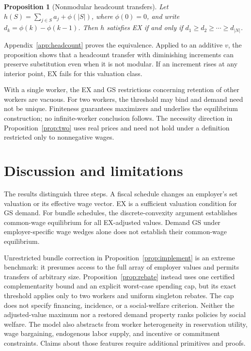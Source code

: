 \documentclass[11pt]{article}
\newtheorem{proposition}{Proposition}
\theoremstyle{definition}
\theoremstyle{remark}
\numberwithin{equation}{section}
\begin{document}
\begin{proposition}[Nonmodular headcount transfers]\label{prop:headcount}
Let $h(S)=\sum_{j\in S}a_j+\phi(|S|)$, where $\phi(0)=0$, and write $d_k=\phi(k)-\phi(k-1)$. Then $h$ satisfies EX if and only if $d_1\ge d_2\ge\cdots\ge d_{|N|}$.
\end{proposition}
\noindent Appendix~\ref{app:headcount} proves the equivalence. Applied to an additive $v$, the proposition shows that a headcount transfer with diminishing increments can preserve substitution even when it is not modular. If an increment rises at any interior point, EX fails for this valuation class.

With a single worker, the EX and GS restrictions concerning retention of other workers are vacuous. For two workers, the threshold may bind and demand need not be unique. Finiteness guarantees maximizers and underlies the equilibrium construction; no infinite-worker conclusion follows. The necessity direction in Proposition~\ref{prop:two} uses real prices and need not hold under a definition restricted only to nonnegative wages.

\section{Discussion and limitations}
The results distinguish three steps. A fiscal schedule changes an employer's set valuation or its effective wage vector. EX is a sufficient valuation condition for GS demand. For bundle schedules, the discrete-convexity argument establishes common-wage equilibrium for all EX-adjusted values. Demand GS under employer-specific wage wedges alone does not establish their common-wage equilibrium.

Unrestricted bundle correction in Proposition~\ref{prop:implement} is an extreme benchmark: it presumes access to the full array of employer values and permits transfers of arbitrary size. Proposition~\ref{prop:rebate} instead uses one certified complementarity bound and an explicit worst-case spending cap, but its exact threshold applies only to two workers and uniform singleton rebates. The cap does not specify financing, incidence, or a social-welfare criterion. Neither the adjusted-value maximum nor a restored demand property ranks policies by social welfare. The model also abstracts from worker heterogeneity in reservation utility, wage bargaining, endogenous labor supply, and incentive or commitment constraints. Claims about those features require additional primitives and proofs.
\end{document}
